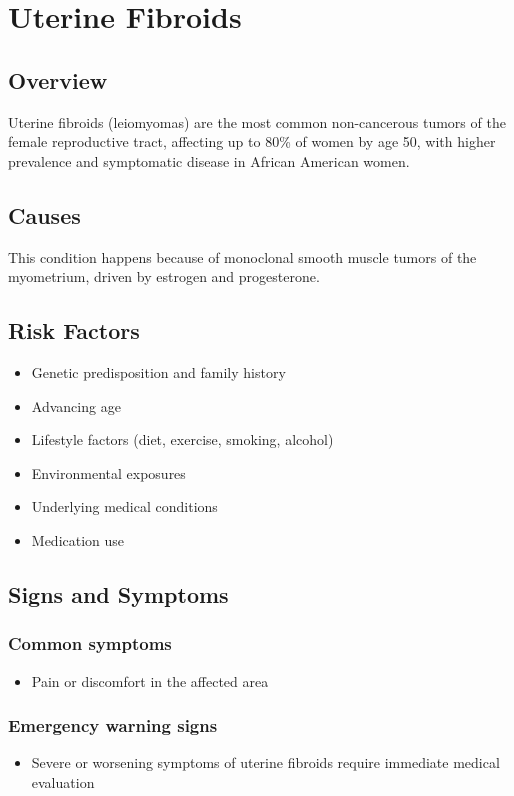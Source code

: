\chapter{Uterine Fibroids}
\label{sec:Uterine Fibroids}

\section{Overview}
Uterine fibroids (leiomyomas) are the most common non-cancerous tumors of the female reproductive tract, affecting up to 80\% of women by age 50, with higher prevalence and symptomatic disease in African American women.
\section{Causes}
This condition happens because of monoclonal smooth muscle tumors of the myometrium, driven by estrogen and progesterone.     
\section{Risk Factors}

\begin{itemize}[noitemsep]
  \item Genetic predisposition and family history
  \item Advancing age
  \item Lifestyle factors (diet, exercise, smoking, alcohol)
  \item Environmental exposures
  \item Underlying medical conditions
  \item Medication use
\end{itemize}
\section{Signs and Symptoms}

\subsection{Common symptoms}
\begin{itemize}[noitemsep]
  \item Pain or discomfort in the affected area
  \end{itemize}

\subsection{Emergency warning signs}
\begin{itemize}[noitemsep]
  \item Severe or worsening symptoms of uterine fibroids require immediate medical evaluation
\end{itemize}
